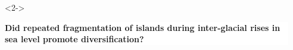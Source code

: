 

{
\begin{frame}
    \begin{columns}

        \vspace{6.5cm}

        \ \\


        \vspace{-2cm}

        \begin{uncoverenv}<2->
        \colorbox{white}{
            \begin{minipage}[t]{1.0\textwidth}
                \raggedright
                \textbf{Did repeated fragmentation of islands during
                    inter-glacial rises in sea level promote diversification?}
            \end{minipage}
        }
        \end{uncoverenv}
    \end{columns}
\end{frame}
}

